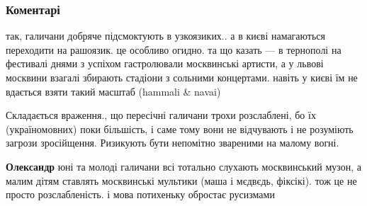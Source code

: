  
 
 
 
 
\subsubsection{Коментарі}
\label{sec:02_08_2021.fb.bryhar_sergej.1.lvov_jazyk.cmt}

\begin{itemize}
 

так, галичани добряче підсмоктують в узкоязиких.. а в києві намагаються
переходити на рашоязик. це особливо огидно. та що казать — в тернополі на
фестивалі днями з успіхом гастролювали москвинські артисти, а у львові москвини
взагалі збирають стадіони з сольними концертами. навіть у києві їм не вдається
взяти такий масштаб (hammali \& navai)


 

Складається враження., що пересічні галичани трохи розслаблені, бо їх
(україномовних) поки більшість, і саме тому вони не відчувають і не розуміють
загрози зросійщення. Ризикують бути непомітно звареними на малому вогні.

\begin{itemize}
 

\textbf{Олександр} юні та молоді галичани всі тотально слухають москвинський музон, а
малим дітям ставлять москвинські мультики (маша і мєдвєдь, фіксікі). тож це не
просто розслабленість. і мова потихеньку обростає русизмами



\end{itemize}
\end{itemize}
